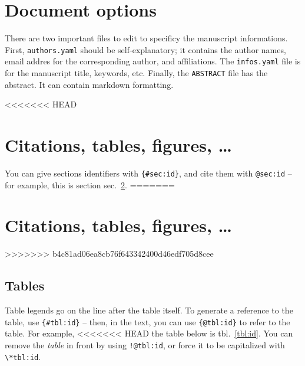 \documentclass[12pt]{article}
\begin{document}
\section{Document options}\label{document-options}

There are two important files to edit to specificy the manuscript
informations. First, \lstinline!authors.yaml! should be
self-explanatory; it contains the author names, email addres for the
corresponding author, and affiliations. The \lstinline!infos.yaml! file
is for the manuscript title, keywords, etc. Finally, the
\lstinline!ABSTRACT! file has the abstract. It can contain markdown
formatting.

<<<<<<< HEAD
\section{Citations, tables, figures, \ldots{}}\label{sec:citation}

You can give sections identifiers with \lstinline!{#sec:id}!, and cite
them with \lstinline!@sec:id! -- for example, this is section
sec.~\ref{sec:citation}.
=======
\section{Citations, tables, figures,
\ldots{}}\label{citations-tables-figures}
>>>>>>> b4c81ad06ea8cb76f643342400d46edf705d8cee

\subsection{Tables}\label{tables}

Table legends go on the line after the table itself. To generate a
reference to the table, use \lstinline!{#tbl:id}! -- then, in the text,
you can use \lstinline!{@tbl:id}! to refer to the table. For example,
<<<<<<< HEAD
the table below is tbl.~\ref{tbl:id}. You can remove the \emph{table} in
front by using \lstinline"!@tbl:id", or force it to be capitalized with
\lstinline!\*tbl:id!.
\end{document}
